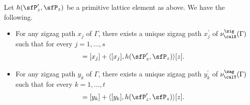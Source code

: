 \begin{Proposition}\label{zigzag_afterdeform2}
Let $h(\sfP^\prime_z,\sfP_z)$ be a primitive lattice element as above.
We have the following.
\begin{itemize}\itemsep=0pt
\item[\rm (1)] For any zigzag path $x_j$ of $\Gamma$,
there exists a unique zigzag path $x_j^\prime$ of $\nu^\zig_\calX(\Gamma)$ such that for every $j=1,\dots,s$
\begin{displaymath}
[x^{\prime}_j]=[x_j]+\langle [x_j],h(\sfP_z^\prime,\sfP_z)\rangle[z].
\end{displaymath}
\item[\rm (2)] For any zigzag path $y_k$ of $\Gamma$, there exists a unique zigzag path $y_k^\prime$ of $\nu^\zag_\calY(\Gamma)$ such that for every $k=1,\dots,t$
\begin{displaymath}
[y^{\prime}_k]=[y_k]+\langle [y_k],h(\sfP_z^\prime,\sfP_z)\rangle[z].
\end{displaymath}
\end{itemize}
\end{Proposition}

